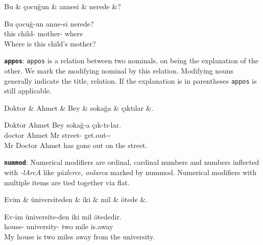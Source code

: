 \documentclass[11pt,a4paper]{article}
\begin{document}
\begin{exe}
\ex \label{nmod:poss}
\begin{dependency}
\begin{deptext}[column sep=0.25cm]
Bu \& çocuğun \& annesi \& nerede \&? \\
\end{deptext}
\end{dependency}
\gll Bu çocuğ-un anne-si nerede?  \\
this child-\Gen{} mother-\Tsg{} where \\
\glt Where is this child’s mother?
\end{exe}

\textbf{\texttt{appos}}:
\texttt{appos} is a relation between two nominals, on being the explanation of the other. We mark the modifying nominal by this relation. Modifying nouns generally indicate the title, relation. If the explanation is in parentheses \texttt{appos} is still applicable.

\begin{exe}
\ex \label{appos}
\begin{dependency}
\begin{deptext}[column sep=0.25cm]
Doktor \& Ahmet \& Bey \& sokağa \& çıktılar \&. \\
\end{deptext}
\end{dependency}
\gll Doktor Ahmet Bey sokağ-a çık-tı-lar.  \\
doctor Ahmet Mr street-\Loc{} get.out-\Pst{}-\Tpl{}\\
\glt Mr Doctor Ahmet has gone out on the street.
\end{exe}

\textbf{\texttt{nummod}}:
Numerical modifiers are ordinal, cardinal numbers and numbers inflected with \textit{-lArcA} like \textit{yüzlerce, onlarca} marked by nummod. Numerical modifiers with multiple items are tied together via flat.

\begin{exe}
\ex \label{nummod}
\begin{dependency}
\begin{deptext}[column sep=0.32cm]
Evim \& üniversiteden \& iki \& mil \& ötede \&. \\
\end{deptext}
\end{dependency}
\gll Ev-im üniversite-den iki mil ötededir.  \\
house-\Fsg{} university-\Abl{} two mile is.away\\
\glt My house is two miles away from the university.
\end{exe}
\end{document}
